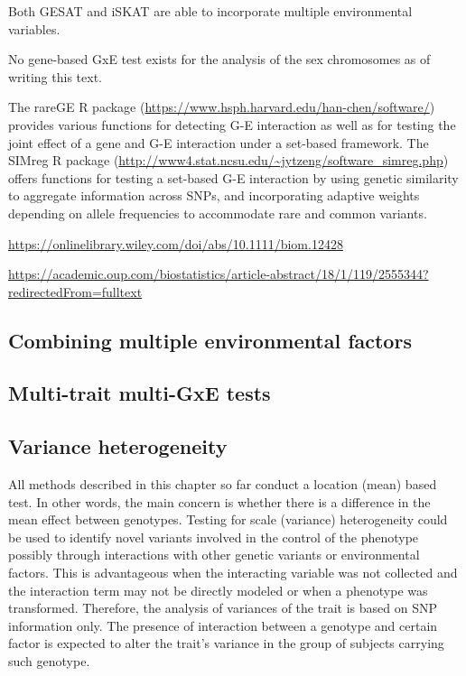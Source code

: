 \documentclass[
]{book}
\begin{document}
Both GESAT and iSKAT are able to incorporate multiple environmental variables.

No gene-based GxE test exists for the analysis of the sex chromosomes as of writing this text.

The rareGE R package (\url{https://www.hsph.harvard.edu/han-chen/software/}) provides various functions for detecting G-E interaction as well as for testing the joint effect of a gene and G-E interaction under a set-based framework.
The SIMreg R package (\url{http://www4.stat.ncsu.edu/~jytzeng/software_simreg.php}) offers functions for testing a set-based G-E interaction by using genetic similarity to aggregate information across SNPs, and incorporating adaptive weights depending on allele frequencies to accommodate rare and common variants.

\url{https://onlinelibrary.wiley.com/doi/abs/10.1111/biom.12428}

\url{https://academic.oup.com/biostatistics/article-abstract/18/1/119/2555344?redirectedFrom=fulltext}

\hypertarget{combining-multiple-environmental-factors}{%
\subsection{Combining multiple environmental factors}\label{combining-multiple-environmental-factors}}

\hypertarget{multi-trait-multi-gxe-tests}{%
\subsection{Multi-trait multi-GxE tests}\label{multi-trait-multi-gxe-tests}}

\hypertarget{variance-heterogeneity}{%
\subsection{Variance heterogeneity}\label{variance-heterogeneity}}

All methods described in this chapter so far conduct a location (mean) based test. In other words, the main concern is whether there is a difference in the mean effect between genotypes. Testing for scale (variance) heterogeneity could be used to identify novel variants involved in the control of the phenotype possibly through interactions with other genetic variants or environmental factors. This is advantageous when the interacting variable was not collected and the interaction term may not be directly modeled or when a phenotype was transformed. Therefore, the analysis of variances of the trait is based on SNP information only. The presence of interaction between a genotype and certain factor is expected to alter the trait's variance in the group of subjects carrying such genotype.
\end{document}
